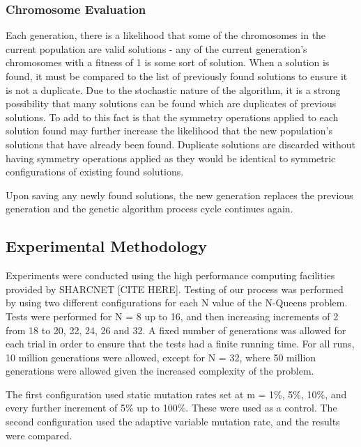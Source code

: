 \documentclass{sig-alternate}
\begin{document}
\subsubsection{Chromosome Evaluation}
Each generation, there is a likelihood that some of the chromosomes in the current population are valid solutions - any of the current generation's chromosomes with a fitness of 1 is some sort of solution. When a solution is found, it must be compared to the list of previously found solutions to ensure it is not a duplicate. Due to the stochastic nature of the algorithm, it is a strong possibility that many solutions can be found which are duplicates of previous solutions. To add to this fact is that the symmetry operations applied to each solution found may further increase the likelihood that the new population's solutions that have already been found. Duplicate solutions are discarded without having symmetry operations applied as they would be identical to symmetric configurations of existing found solutions.

Upon saving any newly found solutions, the new generation replaces the previous generation and the genetic algorithm process cycle continues again.

\subsection{Experimental Methodology}
Experiments were conducted using the high performance computing facilities provided by SHARCNET [CITE HERE]. Testing of our process was performed by using two different configurations for each N value of the N-Queens problem. Tests were performed for N = 8 up to 16, and then increasing increments of 2 from 18 to 20, 22, 24, 26 and 32. A fixed number of generations was allowed for each trial in order to ensure that the tests had a finite running time. For all runs, 10 million generations were allowed, except for N = 32, where 50 million generations were allowed given the increased complexity of the problem.

The first configuration used static mutation rates set at m = 1\%, 5\%, 10\%, and every further increment of 5\% up to 100\%. These were used as a control. The second configuration used the adaptive variable mutation rate, and the results were compared. 
\end{document}
